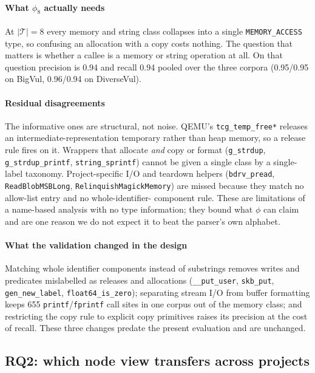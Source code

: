 \documentclass[pdflatex,sn-basic]{sn-jnl}
\theoremstyle{thmstyleone}%
\newcommand{\numbigvulMemopP}{0.95}
\newcommand{\numbigvulMemopR}{0.95}
\newcommand{\numdiversevulMemopP}{0.96}
\newcommand{\numdiversevulMemopR}{0.94}
\newcommand{\numpooledMemopP}{0.94}
\newcommand{\numpooledMemopR}{0.94}
\begin{document}
\paragraph{What $\phi_8$ actually needs} At $|\mathcal{T}|=8$ every memory and
string class collapses into a single \texttt{MEMORY\_ACCESS} type, so confusing
an allocation with a copy costs nothing. The question that matters is whether a
callee is a memory or string operation at all. On that question precision is
\numpooledMemopP{} and recall \numpooledMemopR{} pooled over the three corpora
(\numbigvulMemopP{}/\numbigvulMemopR{} on BigVul,
\numdiversevulMemopP{}/\numdiversevulMemopR{} on DiverseVul).

\paragraph{Residual disagreements} The informative ones are structural, not
noise. QEMU's \texttt{tcg\_temp\_free*} releases an intermediate-representation
temporary rather than heap memory, so a release rule fires on it. Wrappers that
allocate \emph{and} copy or format (\texttt{g\_strdup},
\texttt{g\_strdup\_printf}, \texttt{string\_sprintf}) cannot be given a single
class by a single-label taxonomy. Project-specific I/O and teardown helpers
(\texttt{bdrv\_pread}, \texttt{ReadBlobMSBLong}, \texttt{RelinquishMagickMemory})
are missed because they match no allow-list entry and no whole-identifier-
component rule. These are limitations of a name-based analysis with no type
information; they bound what $\phi$ can claim and are one reason we do not
expect it to beat the parser's own alphabet.

\paragraph{What the validation changed in the design} Matching whole identifier
components instead of substrings removes writes and predicates mislabelled as
releases and allocations (\texttt{\_\_put\_user}, \texttt{skb\_put},
\texttt{gen\_new\_label}, \texttt{float64\_is\_zero}); separating stream I/O
from buffer formatting keeps 655 \texttt{printf}/\texttt{fprintf} call sites in
one corpus out of the memory class; and restricting the copy rule to explicit
copy primitives raises its precision at the cost of recall. These three changes
predate the present evaluation and are unchanged.


\subsection{RQ2: which node view transfers across projects}
\label{sec:rq_representation}
\end{document}
